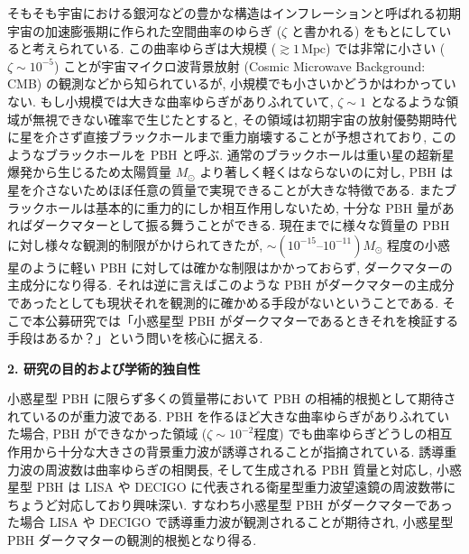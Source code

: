 \documentclass[11pt,a4paper,uplatex,dvipdfmx]{ujarticle} 		%
\newcommand{\研究課題名}{曲率ゆらぎの統計と原始ブラックホール量の精密対応}
\newcommand{\研究機関名}{名古屋大学}
\newcommand{\研究代表者氏名}{多田祐一郎}
\newcommand{\研究期間の最終元号年度}{4}  %
\begin{document}
そもそも宇宙における銀河などの豊かな構造はインフレーションと呼ばれる初期宇宙の加速膨張期に作られた空間曲率のゆらぎ ($\zeta$ と書かれる) をもとにしていると考えられている.
この曲率ゆらぎは大規模 ($\gtrsim1\,\mathrm{Mpc}$) では非常に小さい ($\zeta\sim10^{-5}$) ことが宇宙マイクロ波背景放射 (Cosmic Microwave Background: CMB) の観測などから知られているが,
小規模でも小さいかどうかはわかっていない.
もし小規模では大きな曲率ゆらぎがありふれていて, $\zeta\sim1$ となるような領域が無視できない確率で生じたとすると, その領域は初期宇宙の放射優勢期時代に星を介さず直接ブラックホールまで重力崩壊することが予想されており,
このようなブラックホールを PBH と呼ぶ.
通常のブラックホールは重い星の超新星爆発から生じるため太陽質量 $M_\odot$ より著しく軽くはならないのに対し,
PBH は星を介さないためほぼ任意の質量で実現できることが大きな特徴である.
またブラックホールは基本的に重力的にしか相互作用しないため, 十分な PBH 量があればダークマターとして振る舞うことができる.
現在までに様々な質量の PBH に対し様々な観測的制限がかけられてきたが, $\sim(10^{-15}\text{--}10^{-11})M_\odot$ 程度の小惑星のように軽い PBH に対しては確かな制限はかかっておらず,
ダークマターの主成分になり得る.
それは逆に言えばこのような PBH がダークマターの主成分であったとしても現状それを観測的に確かめる手段がないということである.
そこで本公募研究では「小惑星型 PBH がダークマターであるときそれを検証する手段はあるか？」という問いを核心に据える.




\begin{mdframed}[roundcorner=0.5zw,
	innertopmargin=0.8zw,innerbottommargin=0.8zw,
	linecolor=black!50,linewidth=0.2zw,
	backgroundcolor=black!10]
	{\bfseries\gtfamily\sffamily\large 2. 研究の目的および学術的独自性}
\end{mdframed}

\noindent
小惑星型 PBH に限らず多くの質量帯において PBH の相補的根拠として期待されているのが重力波である.
PBH を作るほど大きな曲率ゆらぎがありふれていた場合, PBH ができなかった領域 ($\zeta\sim10^{-2}$程度) でも曲率ゆらぎどうしの相互作用から十分な大きさの背景重力波が誘導されることが指摘されている.
誘導重力波の周波数は曲率ゆらぎの相関長, そして生成される PBH 質量と対応し, 小惑星型 PBH は LISA や DECIGO に代表される衛星型重力波望遠鏡の周波数帯にちょうど対応しており興味深い.
すなわち小惑星型 PBH がダークマターであった場合 LISA や DECIGO で誘導重力波が観測されることが期待され, 小惑星型 PBH ダークマターの観測的根拠となり得る.
\end{document}
